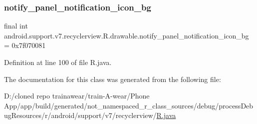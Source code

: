 \subsubsection{\texorpdfstring{notify\_panel\_notification\_icon\_bg}{notify\_panel\_notification\_icon\_bg}}
{\footnotesize\ttfamily final int android.\+support.\+v7.\+recyclerview.\+R.\+drawable.\+notify\+\_\+panel\+\_\+notification\+\_\+icon\+\_\+bg = 0x7f070081\hspace{0.3cm}{\ttfamily [static]}}



Definition at line 100 of file R.\+java.



The documentation for this class was generated from the following file\+:\begin{DoxyCompactItemize}
\item 
D\+:/cloned repo trainawear/train-\/\+A-\/wear/\+Phone App/app/build/generated/not\+\_\+namespaced\+\_\+r\+\_\+class\+\_\+sources/debug/process\+Debug\+Resources/r/android/support/v7/recyclerview/\mbox{\hyperlink{process_debug_resources_2r_2android_2support_2v7_2recyclerview_2_r_8java}{R.\+java}}\end{DoxyCompactItemize}
